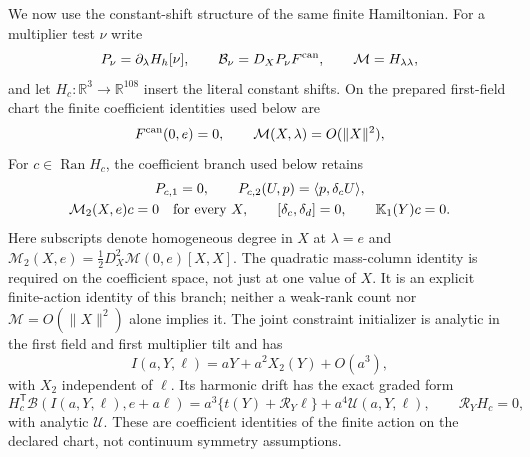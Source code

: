 \documentclass[11pt]{article}
\numberwithin{equation}{section}
\theoremstyle{definition}
\theoremstyle{remark}
\newcommand{\Ran}{\operatorname{Ran}}
\begin{document}
We now use the constant-shift structure of the same finite Hamiltonian.  For
a multiplier test $\nu$ write
\begin{equation}
 P_\nu=\partial_\lambda H_h[\nu],\qquad
 \mathcal B_\nu=D_XP_\nu F^{\rm can},\qquad
 \mathcal M=H_{\lambda\lambda},
 \label{eq:supp-exact-ward-objects}
\end{equation}
and let $H_c:\mathbb R^3\to\mathbb R^{108}$ insert the literal constant
shifts.  On the prepared first-field chart the finite coefficient identities
used below are
\begin{equation}
 F^{\rm can}(0,e)=0,
 \qquad \mathcal M(X,\lambda)=O(\|X\|^2),
 \label{eq:supp-exact-ward-mass-order}
\end{equation}
For $c\in\Ran H_c$, the coefficient branch used below retains
\begin{equation}
 \begin{gathered}
 P_{c,1}=0,\qquad P_{c,2}(U,p)=\langle p,\delta_cU\rangle,\\
 \mathcal M_2(X,e)c=0\quad\hbox{for every }X,\qquad
 [\delta_c,\delta_d]=0,\qquad \mathbb K_1(Y)c=0.
 \end{gathered}
 \label{eq:supp-exact-harmonic-mass-column}
\end{equation}
Here subscripts denote homogeneous degree in $X$ at $\lambda=e$ and
$\mathcal M_2(X,e)=\tfrac12D_X^2\mathcal M(0,e)[X,X]$.
The quadratic mass-column identity is required on the coefficient space,
not just at one value of $X$.  It is an explicit finite-action identity of
this branch; neither a weak-rank count nor $\mathcal M=O(\|X\|^2)$ alone
implies it.  The joint constraint initializer is analytic in the first field and first
multiplier tilt and has
\begin{equation}
 I(a,Y,\ell)=aY+a^2X_2(Y)+O(a^3),
 \label{eq:supp-exact-joint-initializer}
\end{equation}
with $X_2$ independent of $\ell$.  Its harmonic drift has the exact graded
form
\begin{equation}
 H_c^{\mathsf T}\mathcal B(I(a,Y,\ell),e+a\ell)
 =a^3\{t(Y)+\mathcal R_Y\ell\}+a^4\mathcal U(a,Y,\ell),
 \qquad \mathcal R_YH_c=0,
 \label{eq:supp-exact-harmonic-cubic-law}
\end{equation}
with analytic $\mathcal U$.  These are coefficient identities of the finite
action on the declared chart, not continuum symmetry assumptions.
\end{document}
